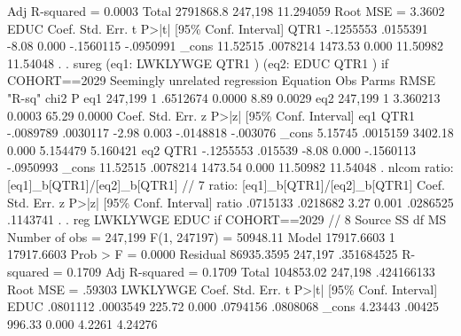    Adj R-squared   =    0.0003
       Total {\VBAR}   2791868.8   247,198   11.294059   Root MSE        =    3.3602
{\smallskip}
        EDUC {\VBAR}      Coef.   Std. Err.      t    P>|t|     [95\% Conf. Interval]
        QTR1 {\VBAR}  -.1255553   .0155391    -8.08   0.000    -.1560115   -.0950991
       _cons {\VBAR}   11.52515   .0078214  1473.53   0.000     11.50982    11.54048
{\smallskip}
. 
. sureg (eq1:  LWKLYWGE QTR1 ) (eq2:  EDUC QTR1 ) if COHORT==2029
{\smallskip}
Seemingly unrelated regression
Equation             Obs   Parms        RMSE    "R-sq"       chi2        P
eq1              247,199       1    .6512674    0.0000       8.89   0.0029
eq2              247,199       1    3.360213    0.0003      65.29   0.0000
{\smallskip}
             {\VBAR}      Coef.   Std. Err.      z    P>|z|     [95\% Conf. Interval]
eq1          {\VBAR}
        QTR1 {\VBAR}  -.0089789   .0030117    -2.98   0.003    -.0148818    -.003076
       _cons {\VBAR}    5.15745   .0015159  3402.18   0.000     5.154479    5.160421
eq2          {\VBAR}
        QTR1 {\VBAR}  -.1255553    .015539    -8.08   0.000    -.1560113   -.0950993
       _cons {\VBAR}   11.52515   .0078214  1473.54   0.000     11.50982    11.54048
{\smallskip}
. nlcom ratio: [eq1]_b[QTR1]/[eq2]_b[QTR1] // 7
{\smallskip}
       ratio:  [eq1]_b[QTR1]/[eq2]_b[QTR1]
{\smallskip}
             {\VBAR}      Coef.   Std. Err.      z    P>|z|     [95\% Conf. Interval]
       ratio {\VBAR}   .0715133   .0218682     3.27   0.001     .0286525    .1143741
{\smallskip}
. 
. reg LWKLYWGE EDUC if  COHORT==2029 // 8
{\smallskip}
      Source {\VBAR}       SS           df       MS      Number of obs   =   247,199
   F(1, 247197)    =  50948.11
       Model {\VBAR}  17917.6603         1  17917.6603   Prob > F        =    0.0000
    Residual {\VBAR}  86935.3595   247,197  .351684525   R-squared       =    0.1709
   Adj R-squared   =    0.1709
       Total {\VBAR}   104853.02   247,198  .424166133   Root MSE        =    .59303
{\smallskip}
    LWKLYWGE {\VBAR}      Coef.   Std. Err.      t    P>|t|     [95\% Conf. Interval]
        EDUC {\VBAR}   .0801112   .0003549   225.72   0.000     .0794156    .0808068
       _cons {\VBAR}    4.23443     .00425   996.33   0.000       4.2261     4.24276
